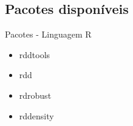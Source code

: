\documentclass[aspectratio=1610, 10pt]{beamer}
\begin{document}
\subsection{Pacotes disponíveis}

\begin{frame}{Pacotes - Linguagem R}
    \begin{itemize}
        \item rddtools
        \item rdd
        \item rdrobust
        \item rddensity
    \end{itemize}
\end{frame}

\end{document}
